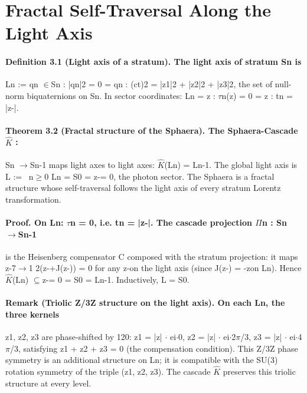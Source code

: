 \section{Fractal Self-Traversal Along the Light Axis}
\paragraph*{Definition 3.1 (Light axis of a stratum). The light axis of stratum Sn is}
Ln := {qn $\in$Sn : |qn|2 = 0} = {qn : (ct)2 = |z1|2 + |z2|2 + |z3|2}, the set of null-norm biquaternions on Sn. In sector coordinates: Ln = {z : $\tau$n(z) = 0} = {z : tn = |z-|}.
\paragraph*{Theorem 3.2 (Fractal structure of the Sphaera). The Sphaera-Cascade $\hat K$ :}
Sn $\to$Sn-1 maps light axes to light axes: $\hat K$(Ln) = Ln-1. The global light axis is L := \ n$\geq$0 Ln = S0 = {z-= 0}, the photon sector. The Sphaera is a fractal structure whose self-traversal follows the light axis of every stratum Lorentz transformation.
\paragraph*{Proof. On Ln: $\tau$n = 0, i.e. tn = |z-|. The cascade projection $\Pi$n : Sn $\to$Sn-1}
is the Heisenberg compensator C composed with the stratum projection: it maps z-7$\to$1 2(z-+J(z-)) = 0 for any z-on the light axis (since J(z-) = -zon Ln). Hence $\hat K$(Ln) $\subseteq${z-= 0} = S0 = Ln-1. Inductively, L = S0.
\paragraph*{Remark (Triolic Z/3Z structure on the light axis). On each Ln, the three kernels}
z1, z2, z3 are phase-shifted by 120: z1 = |z| $\cdot$ ei$\cdot$0, z2 = |z| $\cdot$ ei$\cdot$2$\pi$/3, z3 = |z| $\cdot$ ei$\cdot$4$\pi$/3, satisfying z1 + z2 + z3 = 0 (the compensation condition). This Z/3Z phase symmetry is an additional structure on Ln; it is compatible with the SU(3) rotation symmetry of the triple (z1, z2, z3). The cascade $\hat K$ preserves this triolic structure at every level.

